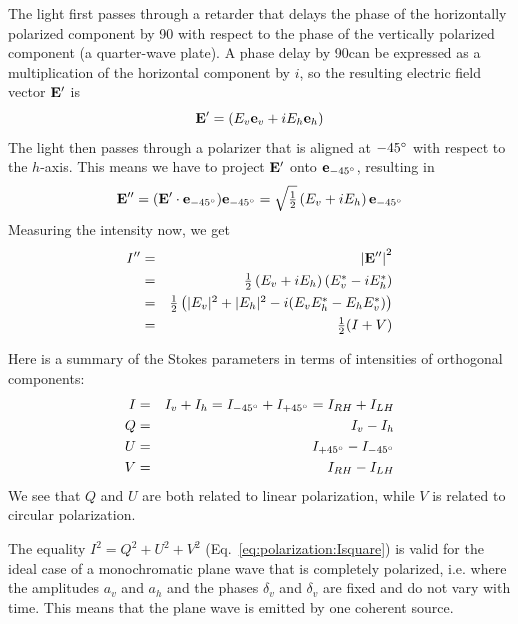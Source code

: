 The light first passes through a retarder that delays the phase of
the horizontally polarized component by 90\degree{} with respect to
the phase of the vertically polarized component (a quarter-wave
plate).
A phase delay by 90\degree can be expressed as a multiplication of the
horizontal component by $i$, so the resulting
electric field vector $\mathbf{E}^\prime$ is
\begin{equation}
  \label{eq:polarization:E_retarded}
  \mathbf{E}^\prime = \left(E_v \mathbf{e}_v +   i E_h \mathbf{e}_h \right) 
\end{equation}
The light then passes through a polarizer that is  aligned at
$-45^\circ$ with respect to the $h$-axis. This means we have to
project $\mathbf{E}^\prime$ onto $\mathbf{e}_{-45^\circ}$, resulting in
\begin{equation}
  \label{eq:polarization:E_retarded_polarized}
  \mathbf{E}^{\prime\prime} 
   = (\mathbf{E}^\prime \cdot \mathbf{e}_{-45^\circ})\mathbf{e}_{-45^\circ} 
   = \sqrt{\textstyle\frac{1}{2}}\left(E_v  +  i E_h  \right) \mathbf{e}_{-45^\circ} 
\end{equation}
Measuring the intensity now, we get
\begin{eqnarray}
  I^{\prime\prime} 
   &=&  \left| \mathbf{E}^{\prime\prime} \right| ^2 \\ \nonumber
   &=& \textstyle\frac{1}{2}\left(E_v +  i E_h  \right)  
     \left(E_v^\ast -  i E_h^\ast  \right)\\ \nonumber
   &=& \textstyle\frac{1}{2} \left( |E_v|^2 + |E_h|^2 - 
        i (E_v E_h^\ast -  E_h E_v^\ast )\right) \\ \nonumber
   &=& \textstyle\frac{1}{2} ( I + V )
  \label{eq:polarization:I_retarded_polarized}
\end{eqnarray}


Here is a summary of the Stokes parameters in terms of intensities of
orthogonal components:
\begin{eqnarray}
  \label{eq:polarization:stokesparam_Idiff_I}
  I &=& I_v + I_h = I_{-45^\circ} + I_{+45^\circ} = I_{RH} + I_{LH}\\
  \label{eq:polarization:stokesparam_Idiff_Q}
  Q &=&   I_v - I_h \\
  \label{eq:polarization:stokesparam_Idiff_U}
  U &=&  I_{+45^\circ} - I_{-45^\circ} \\
  \label{eq:polarization:stokesparam_Idiff_V}
  V &=&  I_{RH} - I_{LH}
\end{eqnarray}
We see that $Q$ and $U$ are both related to linear polarization, while
$V$ is related to circular polarization.




\label{sec:polarization:part_pol}
The equality   $I^2 = Q^2 + U^2 + V^2$
(Eq.~\ref{eq:polarization:Isquare}) 
is valid for the ideal case of a 
monochromatic plane wave that is completely polarized, i.e. where the
amplitudes $a_v$ and
$a_h$ and the phases $\delta_v$ and $\delta_v$ are fixed and do not
vary with time. This means that the plane wave is emitted by one
coherent source.

